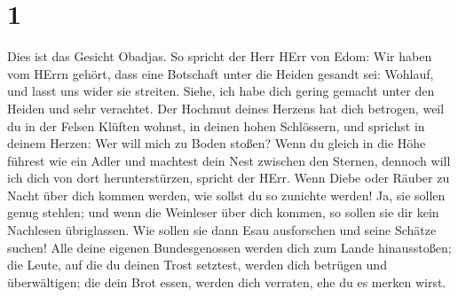 \hypertarget{section}{%
\section{1}\label{section}}

 Dies ist das Gesicht Obadjas. So spricht der Herr HErr von
Edom: Wir haben vom HErrn gehört, dass eine Botschaft unter die Heiden
gesandt sei: Wohlauf, und lasst uns wider sie streiten. 
Siehe, ich habe dich gering gemacht unter den Heiden und sehr verachtet.
 Der Hochmut deines Herzens hat dich betrogen, weil du in
der Felsen Klüften wohnst, in deinen hohen Schlössern, und sprichst in
deinem Herzen: Wer will mich zu Boden stoßen?  Wenn du
gleich in die Höhe führest wie ein Adler und machtest dein Nest zwischen
den Sternen, dennoch will ich dich von dort herunterstürzen, spricht der
HErr.  Wenn Diebe oder Räuber zu Nacht über dich kommen
werden, wie sollst du so zunichte werden! Ja, sie sollen genug stehlen;
und wenn die Weinleser über dich kommen, so sollen sie dir kein
Nachlesen übriglassen.  Wie sollen sie dann Esau ausforschen
und seine Schätze suchen!  Alle deine eigenen Bundesgenossen
werden dich zum Lande hinausstoßen; die Leute, auf die du deinen Trost
setztest, werden dich betrügen und überwältigen; die dein Brot essen,
werden dich verraten, ehe du es merken wirst.

